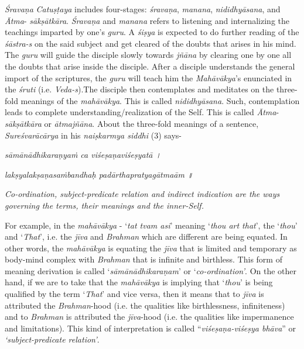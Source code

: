 \emph{Śravaṇa} \emph{Catuṣṭaya} includes four-stages: \emph{śravaṇa}, \emph{manana}, \emph{nididhyāsana}, and \emph{Ātma}- \emph{sākṣātkāra}. \emph{Śravaṇa} and \emph{manana} refers to listening and internalizing the teachings imparted by one's \emph{guru}. A \emph{śiṣya} is expected to do further reading of the \emph{śāstra-s} on the said subject and get cleared of the doubts that arises in his mind. The \emph{guru} will guide the disciple slowly towards \emph{jñāna} by clearing one by one all the doubts that arise inside the disciple. After a disciple understands the general import of the scriptures, the \emph{guru} will teach him the \emph{Mahāvākya}'s enunciated in the \emph{śruti} (i.e. \emph{Veda-s}).The disciple then contemplates and meditates on the three-fold meanings of the \emph{mahāvākya}. This is called \emph{nididhyāsana}. Such, contemplation leads to complete understanding/realization of the Self. This is called \emph{Ātma}-\emph{sākṣātkāra} or \emph{ātmajñāna}. About the three-fold meanings of a sentence, \emph{Sureśvarācārya} in his \emph{naiṣkarmya siddhi} (3) says-

\emph{sāmānādhikaraṇyaṁ ca viśeṣaṇaviśeṣyatā ।}

\emph{lakṣyalakṣaṇasaṁbandhaḥ padārthapratyagātmaām ॥ }

\emph{Co-ordination, subject-predicate relation and indirect indication are the ways governing the terms, their meanings and the inner-Self.}

For example, in the \emph{mahāvākya} - `\emph{tat tvam asi}' meaning `\emph{thou art that}', the `\emph{thou}' and `\emph{That}', i.e. the \emph{jīva} and \emph{Brahman} which are different are being equated. In other words, the \emph{mahāvākya} is equating the \emph{jīva} that is limited and temporary as body-mind complex with \emph{Brahman} that is infinite and birthless. This form of meaning derivation is called `\emph{sāmānādhikaraṇam}' or `\emph{co-ordination'}. On the other hand, if we are to take that the \emph{mahāvākya} is implying that `\emph{thou}' is being qualified by the term `\emph{That}' and vice versa, then it means that to \emph{jīva} is attributed the \emph{Brahman}-hood (i.e. the qualities like birthlessness, infiniteness) and to \emph{Brahman} is attributed the \emph{jīva}-hood (i.e. the qualities like impermanence and limitations). This kind of interpretation is called ``\emph{viśeṣaṇa-viśeṣya bhāva}'' or \emph{`subject-predicate relation'}.

